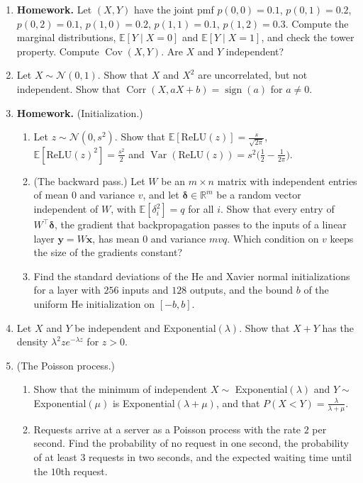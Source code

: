 \documentclass[11pt]{article}
\newcommand{\homework}{\textcolor{red!70!black}{\textbf{Homework.}}}
\newcommand{\E}{\mathbb{E}}
\DeclareMathOperator{\Var}{Var}
\DeclareMathOperator{\Cov}{Cov}
\DeclareMathOperator{\Corr}{Corr}
\theoremstyle{definition}
\theoremstyle{plain}
\theoremstyle{remark}
\DeclareMathOperator{\sign}{sign}
\begin{document}
\begin{enumerate}[leftmargin=*]
\begin{enumerate}[label=(\alph*)]
    \end{enumerate}
    \item\label{ex4:joint-pmf} \homework{} Let $(X, Y)$ have the joint pmf $p(0, 0) = 0.1$, $p(0, 1) = 0.2$, $p(0, 2) = 0.1$, $p(1, 0) = 0.2$, $p(1, 1) = 0.1$, $p(1, 2) = 0.3$. Compute the marginal distributions, $\E[Y \mid X = 0]$ and $\E[Y \mid X = 1]$, and check the tower property. Compute $\Cov(X, Y)$. Are $X$ and $Y$ independent?
    \item Let $X \sim \mathcal{N}(0, 1)$. Show that $X$ and $X^2$ are uncorrelated, but not independent. Show that $\Corr(X, aX + b) = \sign(a)$ for $a \neq 0$.
    \item \homework{} (Initialization.)
    \begin{enumerate}[label=(\alph*)]
        \item Let $z \sim \mathcal{N}(0, s^2)$. Show that $\E[\mathrm{ReLU}(z)] = \frac{s}{\sqrt{2\pi}}$, $\E[\mathrm{ReLU}(z)^2] = \frac{s^2}{2}$ and $\Var(\mathrm{ReLU}(z)) = s^2\big(\frac{1}{2} - \frac{1}{2\pi}\big)$.
        \item (The backward pass.) Let $W$ be an $m \times n$ matrix with independent entries of mean $0$ and variance $v$, and let $\boldsymbol{\delta} \in \mathbb{R}^m$ be a random vector independent of $W$, with $\E[\delta_i^2] = q$ for all $i$. Show that every entry of $W^\top\boldsymbol{\delta}$, the gradient that backpropagation passes to the inputs of a linear layer $\mathbf{y} = W\mathbf{x}$, has mean $0$ and variance $mvq$. Which condition on $v$ keeps the size of the gradients constant?
        \item Find the standard deviations of the He and Xavier normal initializations for a layer with $256$ inputs and $128$ outputs, and the bound $b$ of the uniform He initialization on $[-b, b]$.
    \end{enumerate}
    \item Let $X$ and $Y$ be independent and Exponential$(\lambda)$. Show that $X + Y$ has the density $\lambda^2ze^{-\lambda z}$ for $z > 0$.
    \item (The Poisson process.)
    \begin{enumerate}[label=(\alph*)]
        \item Show that the minimum of independent $X \sim$ Exponential$(\lambda)$ and $Y \sim$ Exponential$(\mu)$ is Exponential$(\lambda + \mu)$, and that $P(X < Y) = \frac{\lambda}{\lambda + \mu}$.
        \item Requests arrive at a server as a Poisson process with the rate $2$ per second. Find the probability of no request in one second, the probability of at least $3$ requests in two seconds, and the expected waiting time until the $10$th request.

\end{enumerate}
\end{enumerate}
\end{document}
